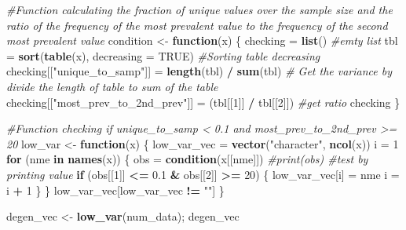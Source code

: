 \documentclass[]{article}
\newenvironment{Shaded}{\begin{snugshade}}{\end{snugshade}}
\newcommand{\CommentTok}[1]{\textcolor[rgb]{0.56,0.35,0.01}{\textit{#1}}}
\newcommand{\ControlFlowTok}[1]{\textcolor[rgb]{0.13,0.29,0.53}{\textbf{#1}}}
\newcommand{\DataTypeTok}[1]{\textcolor[rgb]{0.13,0.29,0.53}{#1}}
\newcommand{\DecValTok}[1]{\textcolor[rgb]{0.00,0.00,0.81}{#1}}
\newcommand{\FloatTok}[1]{\textcolor[rgb]{0.00,0.00,0.81}{#1}}
\newcommand{\KeywordTok}[1]{\textcolor[rgb]{0.13,0.29,0.53}{\textbf{#1}}}
\newcommand{\NormalTok}[1]{#1}
\newcommand{\OperatorTok}[1]{\textcolor[rgb]{0.81,0.36,0.00}{\textbf{#1}}}
\newcommand{\OtherTok}[1]{\textcolor[rgb]{0.56,0.35,0.01}{#1}}
\newcommand{\StringTok}[1]{\textcolor[rgb]{0.31,0.60,0.02}{#1}}
\begin{document}
\begin{Shaded}
\begin{Highlighting}[]
\CommentTok{#Function calculating the fraction of unique values over the sample size and the ratio of the frequency of the most prevalent value to the frequency of the second most prevalent value}
\NormalTok{condition <-}\StringTok{ }\ControlFlowTok{function}\NormalTok{(x) \{}
\NormalTok{  checking =}\StringTok{ }\KeywordTok{list}\NormalTok{()  }\CommentTok{#emty list}
\NormalTok{  tbl =}\StringTok{ }\KeywordTok{sort}\NormalTok{(}\KeywordTok{table}\NormalTok{(x), }\DataTypeTok{decreasing =} \OtherTok{TRUE}\NormalTok{) }\CommentTok{#Sorting table decreasing}
\NormalTok{  checking[[}\StringTok{"unique_to_samp"}\NormalTok{]] =}\StringTok{ }\KeywordTok{length}\NormalTok{(tbl) }\OperatorTok{/}\StringTok{ }\KeywordTok{sum}\NormalTok{(tbl) }\CommentTok{# Get the variance by                                         divide the length of table to sum of the table}
\NormalTok{  checking[[}\StringTok{"most_prev_to_2nd_prev"}\NormalTok{]] =}\StringTok{ }\NormalTok{(tbl[[}\DecValTok{1}\NormalTok{]] }\OperatorTok{/}\StringTok{ }\NormalTok{tbl[[}\DecValTok{2}\NormalTok{]]) }\CommentTok{#get ratio}
\NormalTok{  checking}
\NormalTok{\}}

\CommentTok{#Function checking if unique_to_samp < 0.1 and                                  most_prev_to_2nd_prev >= 20  }
\NormalTok{low_var <-}\StringTok{ }\ControlFlowTok{function}\NormalTok{(x) \{}
\NormalTok{  low_var_vec =}\StringTok{ }\KeywordTok{vector}\NormalTok{(}\StringTok{"character"}\NormalTok{, }\KeywordTok{ncol}\NormalTok{(x))}
\NormalTok{  i =}\StringTok{ }\DecValTok{1}
  \ControlFlowTok{for}\NormalTok{ (nme }\ControlFlowTok{in} \KeywordTok{names}\NormalTok{(x)) \{}
\NormalTok{    obs =}\StringTok{ }\KeywordTok{condition}\NormalTok{(x[[nme]])}
    \CommentTok{#print(obs)  #test by printing value}
    \ControlFlowTok{if}\NormalTok{ (obs[[}\DecValTok{1}\NormalTok{]] }\OperatorTok{<=}\StringTok{ }\FloatTok{0.1} \OperatorTok{&}\StringTok{ }\NormalTok{obs[[}\DecValTok{2}\NormalTok{]] }\OperatorTok{>=}\StringTok{ }\DecValTok{20}\NormalTok{) \{ }
\NormalTok{      low_var_vec[i] =}\StringTok{ }\NormalTok{nme}
\NormalTok{      i =}\StringTok{ }\NormalTok{i }\OperatorTok{+}\StringTok{ }\DecValTok{1}
\NormalTok{    \}}
\NormalTok{  \}}
\NormalTok{  low_var_vec[low_var_vec }\OperatorTok{!=}\StringTok{ ""}\NormalTok{]}
\NormalTok{\}}

\NormalTok{degen_vec <-}\StringTok{ }\KeywordTok{low_var}\NormalTok{(num_data); degen_vec}
\end{Highlighting}
\end{Shaded}
\end{document}
